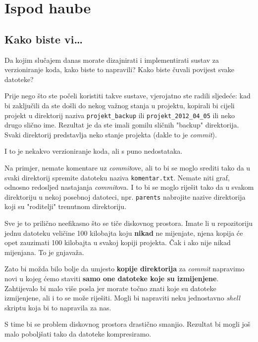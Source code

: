 \chapter*{Ispod haube}

\section*{Kako biste vi\dots}

Da kojim slučajem danas morate dizajnirati i implementirati sustav za verzioniranje koda, kako biste to napravili?
Kako biste čuvali povijest svake datoteke?

Prije nego što ste počeli koristiti takve sustave, vjerojatno ste radili sljedeće: kad bi zaključili da ste došli do nekog važnog stanja u projektu, kopirali bi cijeli projekt u direktorij naziva \verb+projekt_backup+ ili \verb+projekt_2012_04_05+ ili neko drugo slično ime.
Rezultat je da ste imali gomilu sličnih "backup" direktorija.
Svaki direktorij predstavlja neko stanje projekta (dakle to je \emph{commit}).

I to je nekakvo verzioniranje koda, ali s puno nedostataka.

Na primjer, nemate komentare uz \emph{commit}ove, ali to bi se moglo srediti tako da u svaki direktorij spremite datoteku naziva \verb+komentar.txt+.
Nemate niti graf, odnosno redosljed nastajanja \emph{commit}ova.
I to bi se moglo riješit tako da u svakom direktoriju u nekoj posebnoj datoteci, npr. \verb+parents+ nabrojite nazive direktorija koji su "roditelji" trenutnom direktoriju.

Sve je to prilično neefikasno što se tiče diskovnog prostora. 
Imate li u repozitoriju jednu datoteku veličine 100 kilobajta koju \textbf{nikad} ne mijenjate, njena kopija će opet zauzimati 100 kilobajta u svakoj kopiji projekta.
Čak i ako nije nikad mijenjana.
To je gnjavaža.

Zato bi možda bilo bolje da umjesto \textbf{kopije direktorija} za \emph{commit} napravimo novi u kojeg ćemo staviti \textbf{samo one datoteke koje su izmijenjene}.
Zahtijevalo bi malo više posla jer morate točno znati koje su datoteke izmijenjene, ali i to se može riješiti.
Mogli bi napraviti neku jednostavno \emph{shell} skriptu koja bi to napravila za nas. 

S time bi se problem diskovnog prostora drastično smanjio. 
Rezultat bi mogli još malo poboljšati tako da datoteke kompresiramo.

